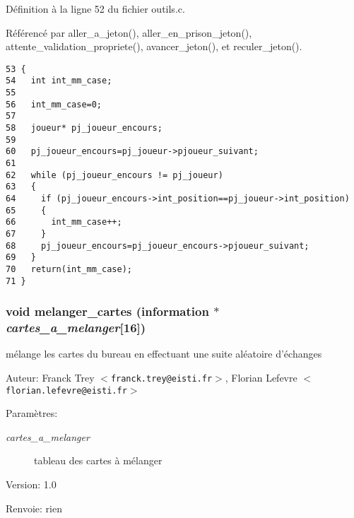 D\'{e}finition \`{a} la ligne 52 du fichier outils.c.

R\'{e}f\'{e}renc\'{e} par aller\_\-a\_\-jeton(), aller\_\-en\_\-prison\_\-jeton(), attente\_\-validation\_\-propriete(), avancer\_\-jeton(), et reculer\_\-jeton().

\begin{Code}\begin{verbatim}53 {
54   int int_mm_case;
55   
56   int_mm_case=0;
57   
58   joueur* pj_joueur_encours;
59   
60   pj_joueur_encours=pj_joueur->pjoueur_suivant;
61   
62   while (pj_joueur_encours != pj_joueur)
63   {
64     if (pj_joueur_encours->int_position==pj_joueur->int_position)
65     {
66       int_mm_case++;
67     }
68     pj_joueur_encours=pj_joueur_encours->pjoueur_suivant;
69   }
70   return(int_mm_case);
71 }
\end{verbatim}\end{Code}


\subsubsection{\setlength{\rightskip}{0pt plus 5cm}void melanger\_\-cartes ({\bf information} $\ast$ {\em cartes\_\-a\_\-melanger}[16])}\label{outils_8c_034d05be61f25003576b3ac8c5a2edb7}


m\'{e}lange les cartes du bureau en effectuant une suite al\'{e}atoire d'\'{e}changes 

\begin{Desc}
\item[Auteur:]Franck Trey $<${\tt franck.trey@eisti.fr}$>$, Florian Lefevre $<${\tt florian.lefevre@eisti.fr}$>$\end{Desc}
\begin{Desc}
\item[Param\`{e}tres:]
\begin{description}
\item[{\em cartes\_\-a\_\-melanger}]tableau des cartes \`{a} m\'{e}langer\end{description}
\end{Desc}
\begin{Desc}
\item[Version:]1.0 \end{Desc}
\begin{Desc}
\item[Renvoie:]rien \end{Desc}


